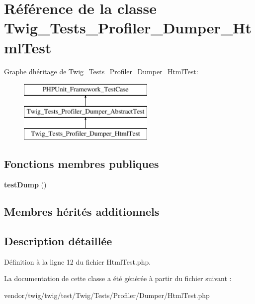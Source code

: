 \hypertarget{class_twig___tests___profiler___dumper___html_test}{}\section{Référence de la classe Twig\+\_\+\+Tests\+\_\+\+Profiler\+\_\+\+Dumper\+\_\+\+Html\+Test}
\label{class_twig___tests___profiler___dumper___html_test}
Graphe d\textquotesingle{}héritage de Twig\+\_\+\+Tests\+\_\+\+Profiler\+\_\+\+Dumper\+\_\+\+Html\+Test\+:\begin{figure}[H]
\begin{center}
\leavevmode
\includegraphics[height=3.000000cm]{class_twig___tests___profiler___dumper___html_test}
\end{center}
\end{figure}
\subsection*{Fonctions membres publiques}
\begin{DoxyCompactItemize}
\item 
{\bfseries test\+Dump} ()\hypertarget{class_twig___tests___profiler___dumper___html_test_a054950b93fb5a74a2d2c89d38f5758ff}{}\label{class_twig___tests___profiler___dumper___html_test_a054950b93fb5a74a2d2c89d38f5758ff}

\end{DoxyCompactItemize}
\subsection*{Membres hérités additionnels}


\subsection{Description détaillée}


Définition à la ligne 12 du fichier Html\+Test.\+php.



La documentation de cette classe a été générée à partir du fichier suivant \+:\begin{DoxyCompactItemize}
\item 
vendor/twig/twig/test/\+Twig/\+Tests/\+Profiler/\+Dumper/Html\+Test.\+php\end{DoxyCompactItemize}
